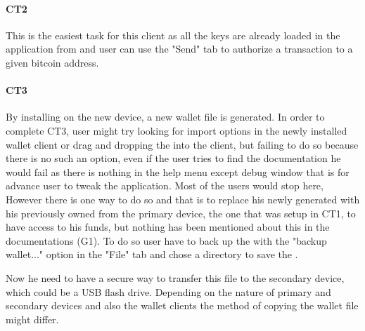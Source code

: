 \paragraph{CT2} This is the easiest task for this client as all the keys are already loaded in the application from \walletfile and user can use the "Send" tab to authorize a transaction to a given bitcoin address.

\paragraph{CT3} By installing \bitcoinclient on the new device, a new wallet file is generated. In order to complete CT3, user might try looking for import options in the newly installed wallet client or drag and dropping the \walletfile into the client, but failing to do so because there is no such an option, even if the user tries to find the documentation he would fail as there is nothing in the help menu except debug window that is for advance user to tweak the application. Most of the users would stop here, However there is one way to do so and that is to replace his newly generated \walletfile with his previously owned \walletfile from the primary device, the one that was setup in CT1, to have access to his funds, but nothing has been mentioned about this in the documentations (G1). To do so user have to back up the \walletfile with the "backup wallet..." option in the "File" tab and chose a directory to save the \walletfile. \

Now he need to have a secure way to transfer this file to the secondary device, which could be a USB flash drive. Depending on the nature of primary and secondary devices and also the wallet clients the method of copying the wallet file might differ. %

